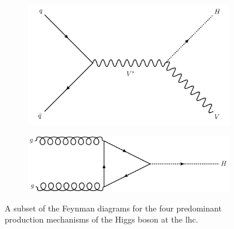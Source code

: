 \begin{figure}[htbp]
    \begin{subfigure}[b]{0.45\textwidth}
        \includegraphics[width=\textwidth]{figures/feynman_diagrams/VH.pdf}
        \caption{\VH}
    \end{subfigure}
    \hfill
    \begin{subfigure}[b]{0.45\textwidth}
        \includegraphics[width=\textwidth]{figures/feynman_diagrams/ggF.pdf}
        \caption{\ggH}
    \end{subfigure}
\caption[A subset of the Feynman diagrams for the four predominant production mechanisms of the Higgs boson at the LHC]{A subset of the Feynman diagrams for the four predominant production mechanisms of the Higgs boson at the \acrshort{lhc}.}
\label{fig:higgs_feynman_diagrams}
\end{figure}

